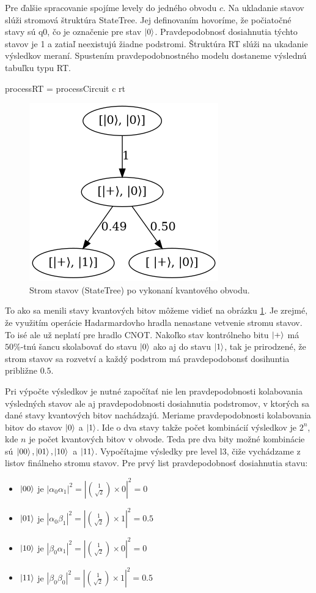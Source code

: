 Pre ďalšie spracovanie spojíme levely  do jedného obvodu \(c\). Na ukladanie
stavov slúži stromová štruktúra StateTree. Jej definovaním hovoríme, že
počiatočné stavy sú q0, čo je označenie pre stav \(\ket{0}\). Pravdepodobnosť
dosiahnutia týchto stavov je 1 a zatiaľ neexistujú žiadne podstromi. Štruktúra
RT slúži na ukadanie výsledkov meraní. Spustením pravdepodobnostného modelu
dostaneme výslednú tabuľku typu RT.

\begin{code}
processRT = processCircuit c rt
\end{code}

\begin{figure}
	\centering 
	\includegraphics[width=.4\textwidth]{figures/ST.png} 
	\caption{Strom stavov (StateTree) po vykonaní kvantového obvodu.}
    \label{stateTree}
\end{figure}

To ako sa menili stavy kvantových bitov môžeme vidieť na obrázku
\ref{stateTree}. Je zrejmé, že využitím operácie Hadarmardovho hradla nenastane
vetvenie stromu stavov. To isé ale už neplatí pre hradlo CNOT. Nakoľko stav
kontrólneho bitu \(\ket{+}\) má \(50\%\)-tnú šancu skolabovať do stavu 
\(\ket{0}\) ako aj do stavu \(\ket{1}\), tak je prirodzené, že strom stavov 
sa rozvetví a každý podstrom má pravdepodobonsť dosihuntia približne \(0.5\).

Pri výpočte výsledkov je nutné započítať nie len pravdepodobnosti kolabovania
výsledných stavov ale aj pravdepodobnosti dosiahnutia podstromov, v ktorých 
sa dané stavy kvantových bitov nachádzajú. Meriame pravdepodobnosti kolabovania
bitov do stavov \(\ket{0}\) a \(\ket{1}\). Ide o dva stavy takže počet
kombinácií výsledkov je \(2^n\), kde \(n\) je počet kvantových bitov v obvode.
Teda pre dva bity možné kombinácie sú \(\ket{00}, \ket{01}, \ket{10}\) a
\(\ket{11}\). Vypočítajme výsledky pre level l3, čiže vychádzame z listov 
finálneho stromu stavov. Pre prvý list pravdepodobnosť dosiahnutia stavu:

\begin{itemize}
    \item \(\ket{00}\) je \(|\alpha_0\alpha_1|^2 = |\binom{1}{\sqrt{2}} \times
0|^2 = 0\)
    \item \(\ket{01}\) je \(|\alpha_0\beta_1|^2 = |\binom{1}{\sqrt{2}} \times
1|^2 = 0.5\)
    \item \(\ket{10}\) je \(|\beta_0\alpha_1|^2 = |\binom{1}{\sqrt{2}} \times
0|^2 = 0\)
    \item \(\ket{11}\) je \(|\beta_0\beta_0|^2 = |\binom{1}{\sqrt{2}} \times
1|^2 = 0.5\)
\end{itemize}

